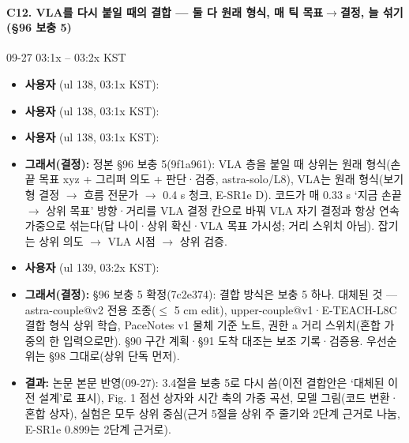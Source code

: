 \paragraph{C12. VLA를 다시 붙일 때의 결합 --- 둘 다 원래 형식, 매 틱 목표$\rightarrow$결정, 늘 섞기 (§96 보충 5)}
{\small 09-27 03:1x -- 03:2x KST}
\begin{itemize}
  \item \textbf{사용자} (ul 138, 03:1x KST): 
  \item \textbf{사용자} (ul 138, 03:1x KST): 
  \item \textbf{사용자} (ul 138, 03:1x KST): 
  \item \textbf{그래서(결정):} 정본 §96 보충 5(9f1a961): VLA 층을 붙일 때 상위는 원래 형식(손끝 목표 xyz + 그리퍼 의도 + 판단·검증, astra-solo/L8), VLA는 원래 형식(보기형 결정 $\rightarrow$ 흐름 전문가 $\rightarrow$ 0.4 s 청크, E-SR1e D). 코드가 매 0.33 s `지금 손끝 $\rightarrow$ 상위 목표' 방향·거리를 VLA 결정 칸으로 바꿔 VLA 자기 결정과 항상 연속 가중으로 섞는다(답 나이·상위 확신·VLA 목표 가시성; 거리 스위치 아님). 잡기는 상위 의도 $\rightarrow$ VLA 시점 $\rightarrow$ 상위 검증.
  \item \textbf{사용자} (ul 139, 03:2x KST): 
  \item \textbf{그래서(결정):} §96 보충 5 확정(7c2e374): 결합 방식은 보충 5 하나. 대체된 것 --- astra-couple@v2 전용 조종($\leq$ 5 cm edit), upper-couple@v1·E-TEACH-L8C 결합 형식 상위 학습, PaceNotes v1 물체 기준 노트, 권한 a 거리 스위치(혼합 가중의 한 입력으로만). §90 구간 계획·§91 도착 대조는 보조 기록·검증용. 우선순위는 §98 그대로(상위 단독 먼저).
  \item \textbf{결과:} 논문 본문 반영(09-27): 3.4절을 보충 5로 다시 씀(이전 결합안은 `대체된 이전 설계'로 표시), Fig. 1 점선 상자와 시간 축의 가중 곡선, 모델 그림(코드 변환·혼합 상자), 실험은 모두 상위 중심(근거 5절을 상위 주 줄기와 2단계 근거로 나눔, E-SR1e 0.899는 2단계 근거로).
\end{itemize}

